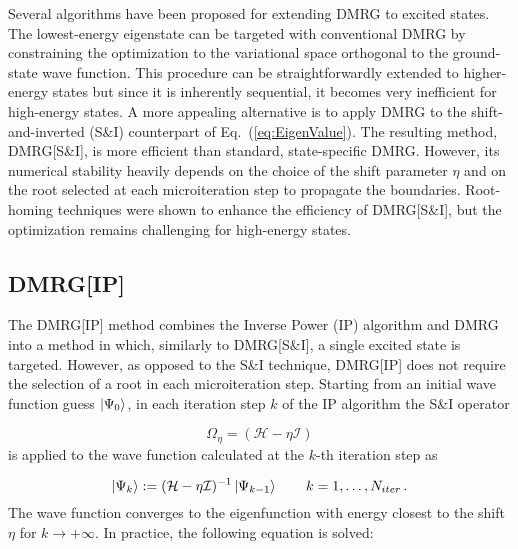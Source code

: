 \documentclass[journal=jctcce]{achemso}
\newcommand{\opr}[1]{\mathcal{#1}}
\begin{document}
\noindent Several algorithms have been proposed for extending DMRG to excited states.\cite{Dorando2007_TargetingExcitedStates,Devakul2017,Yu2017_ShiftAndInvertMPS,Baiardi2019_HighEnergy-vDMRG}
The lowest-energy eigenstate can be targeted with conventional DMRG by constraining the optimization to the variational space orthogonal to the ground-state wave function.\cite{McCulloch2007_FromMPStoDMRG,Keller2015_MPS-MPO-SQHamiltonian} 
This procedure can be straightforwardly extended to higher-energy states but since it is inherently sequential, it becomes very inefficient for high-energy states.
A more appealing alternative is to apply DMRG to the shift-and-inverted (S\&I) counterpart of Eq.~(\ref{eq:EigenValue}).
The resulting method, DMRG[S\&I]\cite{Baiardi2019_HighEnergy-vDMRG}, is more efficient than standard, state-specific DMRG.
However, its numerical stability heavily depends on the choice of the shift parameter $\eta$ and on the root selected at each microiteration step to propagate the boundaries.
Root-homing techniques\cite{Butscher1976_RootHoming,Devakul2017,Baiardi2019_HighEnergy-vDMRG} were shown to enhance the efficiency of DMRG[S\&I], but the optimization remains challenging for high-energy states.

\subsection{DMRG[IP]}
\label{subsec:IP}

The DMRG[IP] method combines the Inverse Power (IP) algorithm and DMRG into a method in which, similarly to DMRG[S\&I], a single excited state is targeted.
However, as opposed to the S\&I technique, DMRG[IP] does not require the selection of a root in each microiteration step.
Starting from an initial wave function guess $\ket{\Psi_{0}}$, in each iteration step $k$ of the IP algorithm the S\&I operator

\begin{equation}
  \Omega_\eta = \left( \mathcal{H} - \eta \mathcal{I} \right)
  \label{eq:SandI_Operator}
\end{equation}
%
is applied to the wave function calculated at the $k$-th iteration step as

\begin{equation}
  \ket{\Psi_{k}} := ( \opr{H} - \eta \opr{I})^{-1} \ket{\Psi_{k-1}}\quad\quad k=1, \dots, N_{iter} \, .
  \label{eq:invPI}
\end{equation}
%
The wave function converges to the eigenfunction with energy closest to the shift $\eta$ for $k \rightarrow +\infty$.
In practice, the following equation is solved:
\end{document}
